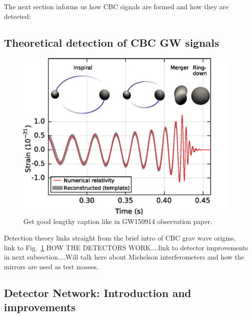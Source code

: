 \documentclass[11pt]{article}
\begin{document}
The next section informs us how CBC signals are formed and how they are detected:

\subsection{Theoretical detection of \ac{CBC} \ac{GW} signals}

\begin{figure}[t!]
    \centering
    \includegraphics[width=.5\linewidth]{shared_resources/shared_figs/inspiral.png}
    \caption{Get good lengthy caption like in GW150914 observation paper.~\cite{abbott2016observation}}
    \label{fig:inspiral}
\end{figure}


Detection theory links straight from the brief intro of CBC grav wave origins, link to Fig.~\ref{fig:inspiral} HOW THE DETECTORS WORK....link to detector improvements in next subsection....Will talk here about Michelson interferometers and how the mirrors are used as test masses.


\subsection{Detector Network: Introduction and improvements}
\end{document}
